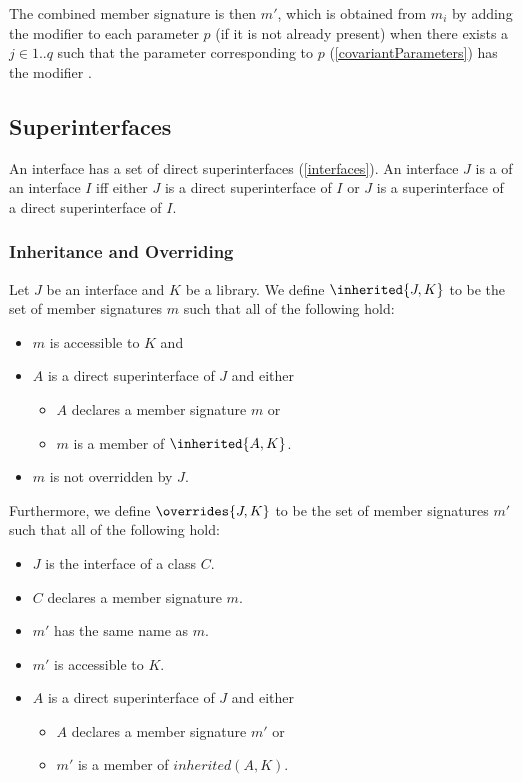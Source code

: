 \documentclass[makeidx]{article}
\begin{document}
\LMHash{}
The combined member signature is then $m'$,
which is obtained from $m_i$ by adding the modifier \COVARIANT{}
to each parameter $p$ (if it is not already present)
when there exists a $j \in 1 .. q$
such that the parameter corresponding to $p$
(\ref{covariantParameters})
has the modifier \COVARIANT{}.
\EndCase


\subsection{Superinterfaces}

\LMHash{}%
An interface has a set of direct superinterfaces
(\ref{interfaces}).
An interface $J$ is a  of an interface $I$
if{}f either $J$ is a direct superinterface of $I$
or $J$ is a superinterface of a direct superinterface of $I$.


\subsubsection{Inheritance and Overriding}

\LMHash{}%
Let $J$ be an interface and $K$ be a library.
We define $\inherited{J, K}$ to be the set of member signatures $m$
such that all of the following hold:
\begin{itemize}
\item $m$ is accessible to $K$ and
\item $A$ is a direct superinterface of $J$ and either
  \begin{itemize}
  \item $A$ declares a member signature $m$ or
  \item $m$ is a member of $\inherited{A, K}$.
  \end{itemize}
\item $m$ is not overridden by $J$.
\end{itemize}

\LMHash{}%
Furthermore, we define $\overrides{J, K}$ to be
the set of member signatures $m'$
such that all of the following hold:
\begin{itemize}
\item $J$ is the interface of a class $C$.
\item $C$ declares a member signature $m$.
\item $m'$ has the same name as $m$.
\item $m'$ is accessible to $K$.
\item $A$ is a direct superinterface of $J$ and either
  \begin{itemize}
  \item $A$ declares a member signature $m'$ or
  \item $m'$ is a member of $inherited(A, K)$.
  \end{itemize}
\end{itemize}
\end{document}

